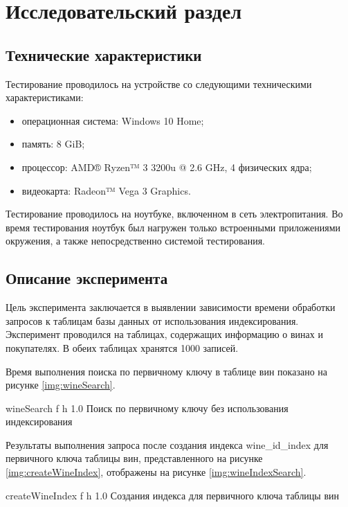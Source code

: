 \chapter{Исследовательский раздел}

\section{Технические характеристики}

Тестирование проводилось на устройстве со следующими техническими характеристиками:

\begin{itemize}
	\item операционная система: Windows 10 Home;
	\item память: 8 GiB;
	\item процессор: AMD® Ryzen™ 3 3200u @ 2.6 GHz, 4 физических ядра;
	\item видеокарта: Radeon™ Vega 3 Graphics.
\end{itemize}

Тестирование проводилось на ноутбуке, включенном в сеть электропитания. Во время тестирования ноутбук был нагружен только встроенными приложениями окружения, а также непосредственно системой тестирования.

\section{Описание эксперимента}

Цель эксперимента заключается в выявлении зависимости времени обработки запросов к таблицам базы данных от использования индексирования. Эксперимент проводился на таблицах, содержащих информацию о винах и покупателях. В обеих таблицах хранятся 1000 записей.

Время выполнения поиска по первичному ключу в таблице вин показано на рисунке \ref{img:wineSearch}.

    {wineSearch}
    {f}
    {h}
    {1.0\textwidth}
    {Поиск по первичному ключу без использования индексирования}
    
Результаты выполнения запроса после создания индекса wine\_id\_index для первичного ключа таблицы вин, представленного на рисунке \ref{img:createWineIndex}, отображены на рисунке \ref{img:wineIndexSearch}.

    {createWineIndex}
    {f}
    {h}
    {1.0\textwidth}
    {Создания индекса для первичного ключа таблицы вин}
    
